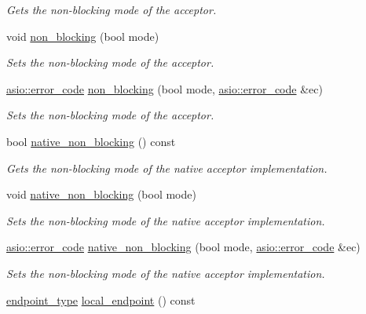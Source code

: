 \begin{DoxyCompactItemize}
\begin{DoxyCompactList}\small\item\em Gets the non-\/blocking mode of the acceptor. \end{DoxyCompactList}\item 
void \hyperlink{classasio_1_1basic__socket__acceptor_a4efaf46120f130598cfd1efafba4c50b}{non\+\_\+blocking} (bool mode)
\begin{DoxyCompactList}\small\item\em Sets the non-\/blocking mode of the acceptor. \end{DoxyCompactList}\item 
\hyperlink{classasio_1_1error__code}{asio\+::error\+\_\+code} \hyperlink{classasio_1_1basic__socket__acceptor_a7fdf2b339704e1081d21eadf6838c3c7}{non\+\_\+blocking} (bool mode, \hyperlink{classasio_1_1error__code}{asio\+::error\+\_\+code} \&ec)
\begin{DoxyCompactList}\small\item\em Sets the non-\/blocking mode of the acceptor. \end{DoxyCompactList}\item 
bool \hyperlink{classasio_1_1basic__socket__acceptor_add5993817d271a4fa71d653a43f8557e}{native\+\_\+non\+\_\+blocking} () const 
\begin{DoxyCompactList}\small\item\em Gets the non-\/blocking mode of the native acceptor implementation. \end{DoxyCompactList}\item 
void \hyperlink{classasio_1_1basic__socket__acceptor_af2b8248a47b46974ea2680556b588201}{native\+\_\+non\+\_\+blocking} (bool mode)
\begin{DoxyCompactList}\small\item\em Sets the non-\/blocking mode of the native acceptor implementation. \end{DoxyCompactList}\item 
\hyperlink{classasio_1_1error__code}{asio\+::error\+\_\+code} \hyperlink{classasio_1_1basic__socket__acceptor_aba053fd0d3a28e24b785bef67007e057}{native\+\_\+non\+\_\+blocking} (bool mode, \hyperlink{classasio_1_1error__code}{asio\+::error\+\_\+code} \&ec)
\begin{DoxyCompactList}\small\item\em Sets the non-\/blocking mode of the native acceptor implementation. \end{DoxyCompactList}\item 
\hyperlink{classasio_1_1basic__socket__acceptor_a393d69e2f8a370aaa13a9018af4c0048}{endpoint\+\_\+type} \hyperlink{classasio_1_1basic__socket__acceptor_a23a516827a33051140c81995c6be030c}{local\+\_\+endpoint} () const 

\end{DoxyCompactItemize}
